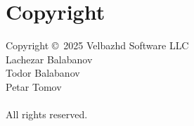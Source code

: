 \chapter*{Copyright}
Copyright \copyright\ 2025 Velbazhd Software LLC\\ Lachezar Balabanov\\ Todor Balabanov\\ Petar Tomov\\\\
All rights reserved.\\
